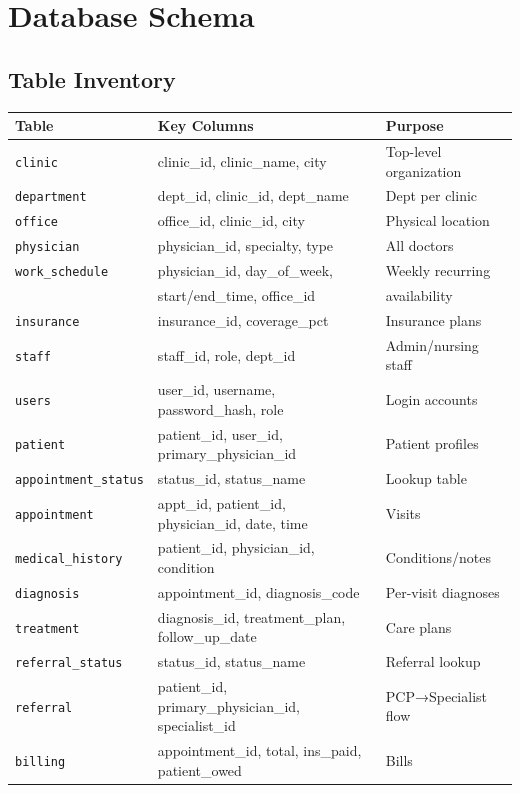 \documentclass[12pt, letterpaper]{article}
\begin{document}
\section{Database Schema}

\subsection{Table Inventory}

\begin{longtable}{lll}
  \toprule
  \textbf{Table} & \textbf{Key Columns} & \textbf{Purpose} \\
  \midrule
  \endhead
  \texttt{clinic}             & clinic\_id, clinic\_name, city    & Top-level organization \\
  \texttt{department}         & dept\_id, clinic\_id, dept\_name  & Dept per clinic \\
  \texttt{office}             & office\_id, clinic\_id, city      & Physical location \\
  \texttt{physician}          & physician\_id, specialty, type    & All doctors \\
  \texttt{work\_schedule}     & physician\_id, day\_of\_week,     & Weekly recurring \\
                              & start/end\_time, office\_id       & availability \\
  \texttt{insurance}          & insurance\_id, coverage\_pct      & Insurance plans \\
  \texttt{staff}              & staff\_id, role, dept\_id         & Admin/nursing staff \\
  \texttt{users}              & user\_id, username, password\_hash, role & Login accounts \\
  \texttt{patient}            & patient\_id, user\_id, primary\_physician\_id & Patient profiles \\
  \texttt{appointment\_status}& status\_id, status\_name          & Lookup table \\
  \texttt{appointment}        & appt\_id, patient\_id, physician\_id, date, time & Visits \\
  \texttt{medical\_history}   & patient\_id, physician\_id, condition & Conditions/notes \\
  \texttt{diagnosis}          & appointment\_id, diagnosis\_code  & Per-visit diagnoses \\
  \texttt{treatment}          & diagnosis\_id, treatment\_plan, follow\_up\_date & Care plans \\
  \texttt{referral\_status}   & status\_id, status\_name          & Referral lookup \\
  \texttt{referral}           & patient\_id, primary\_physician\_id, specialist\_id & PCP→Specialist flow \\
  \texttt{billing}            & appointment\_id, total, ins\_paid, patient\_owed & Bills \\
  \bottomrule
\end{longtable}
\end{document}
